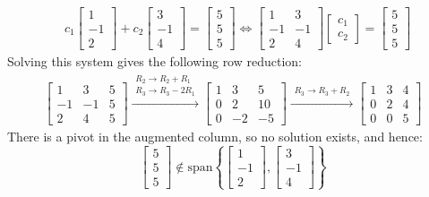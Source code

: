 \documentclass{article}
\begin{document}
\begin{align*}
& c_1\begin{bmatrix} 1 \\ -1 \\ 2 \end{bmatrix} + c_2\begin{bmatrix} 3 \\ -1 \\ 4 \end{bmatrix} = \begin{bmatrix} 5 \\ 5 \\ 5 \end{bmatrix}   
\iff \begin{bmatrix}
1 & 3 \\ 
-1 & -1 \\ 
2 & 4 
\end{bmatrix}\begin{bmatrix}
c_1 \\ c_2 
\end{bmatrix} = \begin{bmatrix} 5 \\ 5 \\ 5 \end{bmatrix}
\end{align*}   
Solving this system gives the following row reduction:
\begin{align*}
\left[\begin{array}{cc|c}
1 & 3 & 5 \\ 
-1 & -1 & 5 \\
2 & 4 & 5
\end{array}\right] 
\xrightarrow{\begin{array}{c} R_2 \rightarrow R_2 + R_1 \\ R_3 \rightarrow R_3 - 2R_1 \end{array}}  
\left[\begin{array}{cc|c}
1 & 3 & 5 \\ 
0 & 2 & 10 \\
0 & -2 & -5
\end{array}\right] 
\xrightarrow{\begin{array}{c} R_3 \rightarrow R_3 + R_2 \end{array}}  
\left[\begin{array}{cc|c}
1 & 3 & 4 \\ 
0 & 2 & 4 \\
0 & 0 & 5
\end{array}\right] 
\end{align*}
There is a pivot in the augmented column, so no solution exists, and hence:
\[\begin{bmatrix} 5 \\ 5 \\ 5 \end{bmatrix} \notin \text{span}\left\{\begin{bmatrix} 1 \\ -1 \\ 2 \end{bmatrix}, \begin{bmatrix} 3 \\ -1 \\ 4 \end{bmatrix}\right\}\]  
\end{document}
